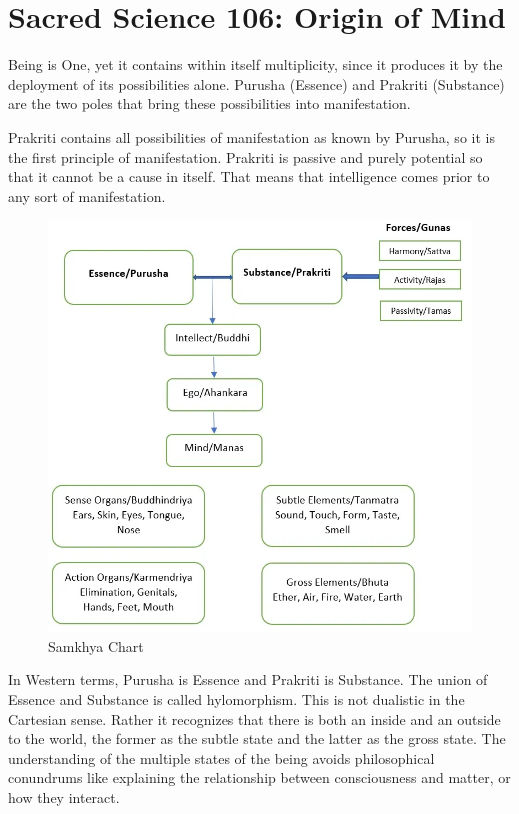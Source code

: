 \section{Sacred Science 106: Origin of Mind}

Being is One, yet it contains within itself multiplicity, since it produces it by the deployment of its possibilities alone. Purusha (Essence) and Prakriti (Substance) are the two poles that bring these possibilities into manifestation.

Prakriti contains all possibilities of manifestation as known by Purusha, so it is the first principle of manifestation. Prakriti is passive and purely potential so that it cannot be a cause in itself. That means that intelligence comes prior to any sort of manifestation.

\begin{figure}[t]
\centering
\includegraphics[scale=.35]{SamkhyaChart.png}
\caption{Samkhya Chart}
\end{figure} 

In Western terms, Purusha is Essence and Prakriti is Substance. The union of Essence and Substance is called hylomorphism. This is not dualistic in the Cartesian sense. Rather it recognizes that there is both an inside and an outside to the world, the former as the subtle state and the latter as the gross state. The understanding of the multiple states of the being avoids philosophical conundrums like explaining the relationship between consciousness and matter, or how they interact.

